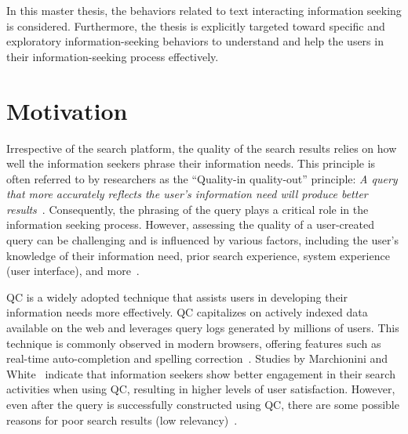 In this master thesis, the behaviors related to text interacting information seeking is considered. Furthermore, the thesis is explicitly targeted toward specific and exploratory information-seeking behaviors to understand and help the users in their information-seeking process effectively.

\section{Motivation}

Irrespective of the search platform, the quality of the search results relies on how well the information seekers phrase their information needs. This principle is often referred to by researchers as the ``Quality-in quality-out'' principle: \emph{A query that more accurately reflects the user's information need will produce better results}~\cite{croft1987i3r}. Consequently, the phrasing of the query plays a critical role in the information seeking process. However, assessing the quality of a user-created query can be challenging and is influenced by various factors, including the user's knowledge of their information need, prior search experience, system experience (user interface), and more~\cite{marchionini2007find}.

 \ac{QC} is a widely adopted technique that assists users in developing their information needs more effectively. \ac{QC} capitalizes on actively indexed data available on the web and leverages query logs generated by millions of users. This technique is commonly observed in modern browsers, offering features such as real-time auto-completion and spelling correction~\cite{bast2006type, gaizauskas1998information}. Studies by Marchionini and White~\cite{marchionini2007find} indicate that information seekers show better engagement in their search activities when using \ac{QC}, resulting in higher levels of user satisfaction. However, even after the query is successfully constructed using \ac{QC}, there are some possible reasons for poor search results (low relevancy)~\cite{azad2019query}. 

